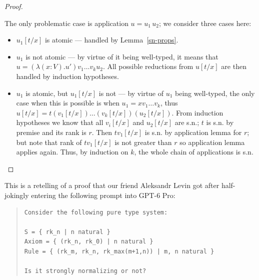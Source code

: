 \documentclass{article}
\theoremstyle{definition}
\theoremstyle{remark}
\begin{document}
\begin{proof}
\begin{itemize}
            The only problematic case is
            application $u=u_1\,u_2$; we consider three
            cases here:
            \begin{itemize}
                \item $u_1[t/x]$ is atomic --- handled
                    by Lemma~\ref{sn-props}.
                \item $u_1$ is not atomic --- by virtue
                    of it being well-typed, it means
                    that $u=(\lambda(x:V).u')v_1
                    \ldots v_k u_2$. All possible
                    reductions from $u[t/x]$ are then
                    handled by induction hypotheses.
                \item $u_1$ is atomic, but $u_1[t/x]$
                    is not --- by virtue of $u_1$ being
                    well-typed, the only case when
                    this is possible is when
                    $u_1 = x v_1\ldots v_k$, thus
                    $u[t/x]=t (v_1[t/x])\ldots
                    (v_k[t/x])(u_2[t/x])$. From
                    induction hypotheses we know that
                    all $v_i[t/x]$ and $u_2[t/x]$ are
                    s.n.; $t$ is s.n. by premise and
                    its rank is $r$. Then $t v_1[t/x]$
                    is s.n. by application lemma for
                    $r$; but note that rank of
                    $t v_1[t/x]$ is not greater than
                    $r$ so application lemma applies
                    again. Thus, by induction on $k$,
                    the whole chain of applications is
                    s.n.
            \end{itemize}
    \end{itemize}
\end{proof}

\vspace{-.5em}
This is a retelling of a proof that our friend
Aleksandr Levin got after half-jokingly entering the
following prompt into GPT-6 Pro:

\begin{quote}
\begin{verbatim}
Consider the following pure type system:

S = { rk_n | n natural }
Axiom = { (rk_n, rk_0) | n natural }
Rule = { (rk_m, rk_n, rk_max(m+1,n)) | m, n natural }

Is it strongly normalizing or not?
\end{verbatim}
\end{quote}
\end{document}
